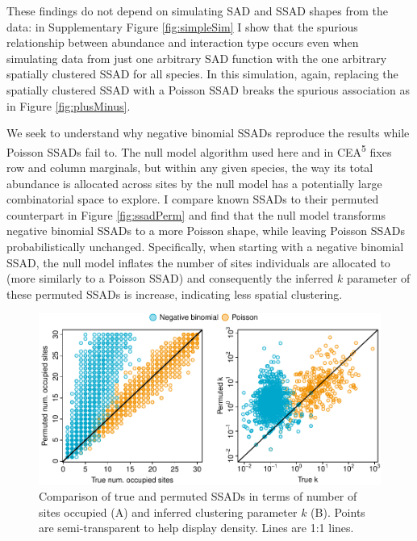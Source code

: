 \documentclass[]{article}
\begin{document}
These findings do not depend on simulating SAD and SSAD shapes from the
data: in Supplementary Figure \ref{fig:simpleSim} I show that the
spurious relationship between abundance and interaction type occurs even
when simulating data from just one arbitrary SAD function with the one
arbitrary spatially clustered SSAD for all species. In this simulation,
again, replacing the spatially clustered SSAD with a Poisson SSAD breaks
the spurious association as in Figure \ref{fig:plusMinus}.

We seek to understand why negative binomial SSADs reproduce the results
while Poisson SSADs fail to. The null model algorithm used here and in
CEA\textsuperscript{5} fixes row and column marginals, but within any
given species, the way its total abundance is allocated across sites by
the null model has a potentially large combinatorial space to explore. I
compare known SSADs to their permuted counterpart in Figure
\ref{fig:ssadPerm} and find that the null model transforms negative
binomial SSADs to a more Poisson shape, while leaving Poisson SSADs
probabilistically unchanged. Specifically, when starting with a negative
binomial SSAD, the null model inflates the number of sites individuals
are allocated to (more similarly to a Poisson SSAD) and consequently the
inferred \(k\) parameter of these permuted SSADs is increase, indicating
less spatial clustering.

\begin{figure}

{\centering \includegraphics{RarePlusComMinus_files/figure-latex/ssadPerm_plot-1} 

}

\caption{Comparison of true and permuted SSADs in terms of number of sites occupied (A) and inferred clustering parameter $k$ (B). Points are semi-transparent to help display density. Lines are 1:1 lines. \label{fig:ssadPerm}}\label{fig:ssadPerm_plot}
\end{figure}
\end{document}
